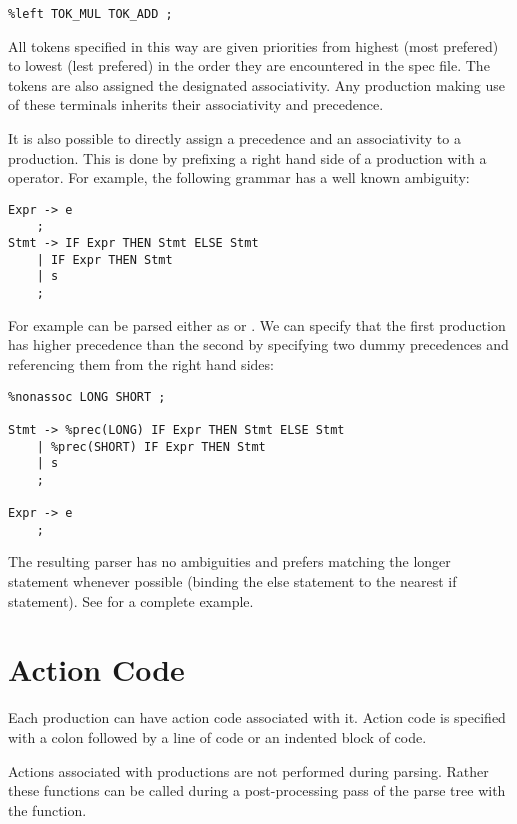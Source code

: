 \begin{verbatim}
%left TOK_MUL TOK_ADD ;
\end{verbatim}

All tokens specified in this way are given priorities from highest
(most prefered) to lowest (lest prefered) in the order they are 
encountered in the
spec file.  The tokens are also assigned the designated associativity.
Any production making use of these terminals inherits their
associativity and precedence.

It is also possible to directly assign a precedence and an associativity
to a production.  This is done by prefixing a right hand side of a
production with a  operator.  
For example, the following grammar has a
well known ambiguity:

\begin{verbatim}
Expr -> e
    ;
Stmt -> IF Expr THEN Stmt ELSE Stmt
    | IF Expr THEN Stmt 
    | s
    ;
\end{verbatim}

For example  can be parsed
either as  or
.  We can specify that
the first  production has higher precedence than the second
by specifying two dummy precedences and referencing them from
the right hand sides:

\begin{verbatim}
%nonassoc LONG SHORT ;

Stmt -> %prec(LONG) IF Expr THEN Stmt ELSE Stmt
    | %prec(SHORT) IF Expr THEN Stmt 
    | s
    ;

Expr -> e
    ;
\end{verbatim}

The resulting parser has no ambiguities and prefers
matching the longer statement whenever possible (binding the
else statement to the nearest if statement).  
See  for a complete example.

\section{Action Code}
Each production can have action code associated with it.  Action code
is specified with a colon followed by a line of code or an indented
block of code.

Actions associated with productions are not performed during parsing.
Rather these functions can be called during a post-processing pass of
the parse tree with the  function.  

